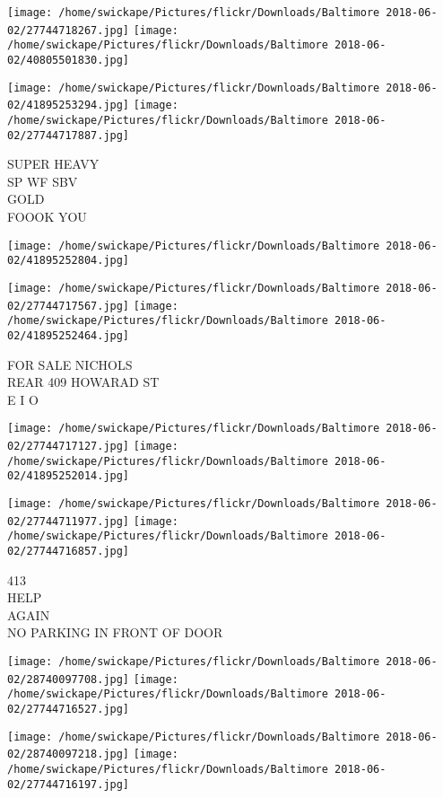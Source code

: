 \documentclass[10pt,letterpaper]{article}
\begin{document}
\texttt{[image: /home/swickape/Pictures/flickr/Downloads/Baltimore 2018-06-02/27744718267.jpg]}
\texttt{[image: /home/swickape/Pictures/flickr/Downloads/Baltimore 2018-06-02/40805501830.jpg]}

\texttt{[image: /home/swickape/Pictures/flickr/Downloads/Baltimore 2018-06-02/41895253294.jpg]}
\texttt{[image: /home/swickape/Pictures/flickr/Downloads/Baltimore 2018-06-02/27744717887.jpg]}

SUPER HEAVY\\
SP WF SBV\\
GOLD\\
FOOOK YOU
\pagebreak

\texttt{[image: /home/swickape/Pictures/flickr/Downloads/Baltimore 2018-06-02/41895252804.jpg]}

\vspace{0.25in}
\texttt{[image: /home/swickape/Pictures/flickr/Downloads/Baltimore 2018-06-02/27744717567.jpg]}
\texttt{[image: /home/swickape/Pictures/flickr/Downloads/Baltimore 2018-06-02/41895252464.jpg]}

FOR SALE NICHOLS\\
REAR 409 HOWARAD ST\\
E I O
\pagebreak

\texttt{[image: /home/swickape/Pictures/flickr/Downloads/Baltimore 2018-06-02/27744717127.jpg]}
\texttt{[image: /home/swickape/Pictures/flickr/Downloads/Baltimore 2018-06-02/41895252014.jpg]}

\texttt{[image: /home/swickape/Pictures/flickr/Downloads/Baltimore 2018-06-02/27744711977.jpg]}
\texttt{[image: /home/swickape/Pictures/flickr/Downloads/Baltimore 2018-06-02/27744716857.jpg]}

413\\
HELP\\
AGAIN\\
NO PARKING IN FRONT OF DOOR
\pagebreak

\texttt{[image: /home/swickape/Pictures/flickr/Downloads/Baltimore 2018-06-02/28740097708.jpg]}
\texttt{[image: /home/swickape/Pictures/flickr/Downloads/Baltimore 2018-06-02/27744716527.jpg]}

\texttt{[image: /home/swickape/Pictures/flickr/Downloads/Baltimore 2018-06-02/28740097218.jpg]}
\texttt{[image: /home/swickape/Pictures/flickr/Downloads/Baltimore 2018-06-02/27744716197.jpg]}
\end{document}
